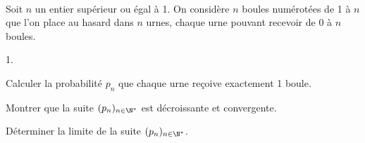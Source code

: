 \documentclass[11pt]{article}%
\begin{document}

\begin{exerciceSP}~\\
  Soit $n$ un entier supérieur ou égal à 1. On considère $n$ boules
  numérotées de 1 à $n$ que l'on place au hasard dans $n$ urnes,
  chaque urne pouvant recevoir de 0 à $n$ boules. 
  \begin{noliste}{1.}
    \setlength{\itemsep}{2mm}
  \item Calculer la probabilité $p_n$ que chaque urne reçoive
    exactement 1 boule. 
  \item Montrer que la suite $(p_n)_{n \in \N^*}$ est décroissante et
    convergente. 
  \item Déterminer la limite de la suite $(p_n)_{n \in \N^*}$.
  \end{noliste}
\end{exerciceSP}

\end{document}
